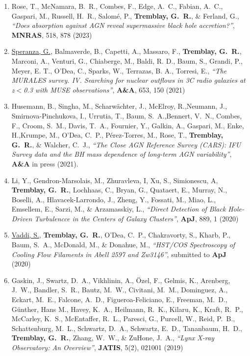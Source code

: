 \documentclass[11pt]{article}
\begin{document}
\begin{enumerate}
\item Rose, T., McNamara, B.~R., Combes, F., Edge, A.~C., Fabian, A.~C., Gaspari, M., Russell, H.~R., Salom\'{e}, P., \textbf{Tremblay, G.~R.}, \& Ferland, G., \textit{``Does absorption against AGN reveal supermassive black hole accretion?''}, \textbf{MNRAS}, 518, 878 (2023)

\item \uline{Speranza, G.}, Balmaverde, B., Capetti, A., Massaro, F., \textbf{Tremblay, G.~R.}, Marconi, A., Venturi, G., Chiaberge, M., Baldi, R. D., Baum, S., Grandi, P., Meyer, E. T., O'Dea, C., Sparks, W., Terrazas, B. A., Torresi, E., \textit{``The MURALES survey. IV. Searching for nuclear outflows in 3C radio galaxies at z$<$0.3 with MUSE observations''}, \textbf{A\&A}, 653, 150 (2021)

\item Husemann, B., Singha, M., Scharw\"{a}chter, J., McElroy, R.,Neumann, J.,
Smirnova-Pinchukova, I., Urrutia, T., Baum, S.~A.,Bennert, V.~N., Combes, F., Croom, S.~M.,
Davis, T.~A., Fournier, Y., Galkin, A., Gaspari, M., Enke, H.,Krumpe, M., O'Dea, C.~P.,
P\'{e}rez-Torres, M., Rose, T., \textbf{Tremblay, G.~R.}, \& Walcher, C.~J., \textit{``The Close AGN Reference Survey (CARS): IFU Survey data and the BH mass dependence of long-term AGN variability''},
\textbf{A\&A} in press (2021).

\item Li, Y., Gendron-Marsolais, M., Zhuravleva, I, Xu, S.,
Simionescu, A, \textbf{Tremblay, G.~R.}, Lochhaas, C., Bryan, G.,
Quataert, E., Murray, N., Boselli, A., Hlavacek-Larrondo, J.,
Zheng, Y., Fossati, M., Miao, L., Emsellem, E., Sarzi, M.,
\& Arzamasskiy, L., \textit{``Direct Detection of Black Hole-Driven Turbulencce
in the Centers of Galaxy Clusters''}, \textbf{ApJ}, 889, 1 (2020)

\item \uline{Vaddi, S.}, \textbf{Tremblay, G.~R.}, O'Dea, C.~P.,
Chakravorty, S., Kharb, P., Baum, S.~A., McDonald, M., \& Donahue, M.,
\textit{``HST/COS Spectroscopy of Cooling Flow Filaments in Abell 2597 and Zw3146''},
submitted to \textbf{ApJ} (2020)


\item Gaskin, J., Swartz, D.~A., Vikhlinin, A., \"{O}zel, F.,
Gelmis, K., Arenberg, J.~W., Bandler, S.~R., Bautz, M.~W., Civitani, M.~M.,
Dominguez, A., Eckart, M.~E., Falcone, A.~D., Figueroa-Feliciano, E.,
Freeman, M.~D., G\"{u}nther, Hans M., Havey, K.~A., Heilmann, R.~K.,
Kilaru, K., Kraft, R.~P., McCarley, K.~S., McEntaffer, R.~L.,
Paresci, G., Purcell, W., Reid, P.~B., Schattenburg, M.~L.,
Schwartz, D.~A., Schwartz, E.~D., Tananbaum, H.~D.,
\textbf{Tremblay, G.~R.}, Zhang, W.~W., \& ZuHone, J.~A.,
\textit{``Lynx X-ray Observatory: An Overview''}, \textbf{JATIS}, 5(2), 021001 (2019)


\end{enumerate}
\end{document}
